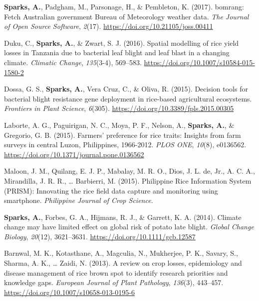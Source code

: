 \documentclass[11pt, a4paper]{awesome-cv}
\begin{document}
\leavevmode\hypertarget{ref-Sparks2017a}{}%
\textbf{Sparks, A.}, Padgham, M., Parsonage, H., \& Pembleton, K.
(2017). {bomrang}: {Fetch Australian} government {Bureau of Meteorology}
weather data. \emph{The Journal of Open Source Software}, \emph{2}(17).
\url{https://doi.org/10.21105/joss.00411}

\leavevmode\hypertarget{ref-Duku2016}{}%
Duku, C., \textbf{Sparks, A.}, \& Zwart, S. J. (2016). Spatial modelling
of rice yield losses in {Tanzania} due to bacterial leaf blight and leaf
blast in a changing climate. \emph{Climatic Change}, \emph{135}(3-4),
569--583. \url{https://doi.org/10.1007/s10584-015-1580-2}

\leavevmode\hypertarget{ref-Dossa2015}{}%
Dossa, G. S., \textbf{Sparks, A.}, Vera Cruz, C., \& Oliva, R. (2015).
Decision tools for bacterial blight resistance gene deployment in
rice-based agricultural ecosystems. \emph{Frontiers in Plant Science},
\emph{6}(305). \url{https://doi.org/10.3389/fpls.2015.00305}

\leavevmode\hypertarget{ref-Laborte2015}{}%
Laborte, A. G., Paguirigan, N. C., Moya, P. F., Nelson, A.,
\textbf{Sparks, A.}, \& Gregorio, G. B. (2015). Farmers' preference for
rice traits: {Insights} from farm surveys in central {Luzon,
Philippines}, 1966-2012. \emph{PLOS ONE}, \emph{10}(8), e0136562.
\url{https://doi.org/10.1371/journal.pone.0136562}

\leavevmode\hypertarget{ref-Maloon2015}{}%
Maloon, J. M., Quilang, E. J. P., Mabalay, M. R. O., Dios, J. L. de,
Jr., A. C. A., Mirandilla, J. R. R., \ldots{} Barbierri, M. (2015).
{Philippine Rice Information System (PRISM)}: Innovating the rice field
data capture and monitoring using smartphone. \emph{Philippine Journal
of Crop Science}.

\leavevmode\hypertarget{ref-Sparks2014}{}%
\textbf{Sparks, A.}, Forbes, G. A., Hijmans, R. J., \& Garrett, K. A.
(2014). Climate change may have limited effect on global risk of potato
late blight. \emph{Global Change Biology}, \emph{20}(12), 3621--3631.
\url{https://doi.org/10.1111/gcb.12587}

\leavevmode\hypertarget{ref-Barnwal2013}{}%
Barnwal, M. K., Kotasthane, A., Magculia, N., Mukherjee, P. K., Savary,
S., Sharma, A. K., \ldots{} Zaidi, N. (2013). A review on crop losses,
epidemiology and disease management of rice brown spot to identify
research priorities and knowledge gaps. \emph{European Journal of Plant
Pathology}, \emph{136}(3), 443--457.
\url{https://doi.org/10.1007/s10658-013-0195-6}
\end{document}
